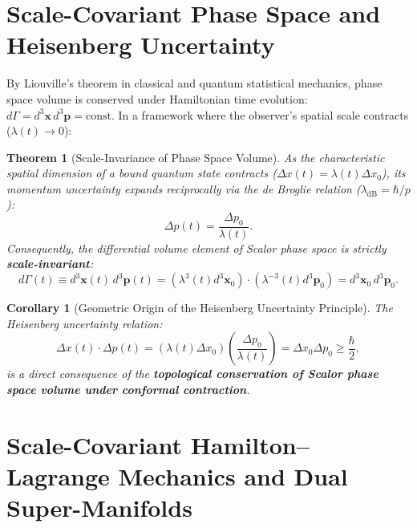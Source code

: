 \documentclass[11pt,a4paper]{article}
\newtheorem{theorem}{Theorem}[section]
\newtheorem{corollary}{Corollary}[theorem]
\begin{document}
\section{Scale-Covariant Phase Space and Heisenberg Uncertainty}
\label{sec:faz_uzayi_heisenberg}

By Liouville's theorem in classical and quantum statistical mechanics, phase space volume is conserved under Hamiltonian time evolution: $d\Gamma = d^3\mathbf{x} \, d^3\mathbf{p} = \text{const}$. In a framework where the observer's spatial scale contracts ($\lambda(t) \to 0$):

\begin{theorem}[Scale-Invariance of Phase Space Volume]
    \label{thm:faz_uzayi_degismezligi_sc}
    As the characteristic spatial dimension of a bound quantum state contracts ($\Delta x(t) = \lambda(t) \Delta x_0$), its momentum uncertainty expands reciprocally via the de Broglie relation ($\lambda_{\mathrm{dB}} = \hbar / p$):
    \begin{equation}
        \Delta p(t) = \frac{\Delta p_0}{\lambda(t)}.
        \label{eq:momentum_genlesme}
    \end{equation}
    Consequently, the differential volume element of Scalor phase space is strictly \textbf{scale-invariant}:
    \begin{equation}
        d\Gamma(t) \equiv d^3\mathbf{x}(t) \, d^3\mathbf{p}(t) = \left( \lambda^3(t) d^3\mathbf{x}_0 \right) \cdot \left( \lambda^{-3}(t) d^3\mathbf{p}_0 \right) = d^3\mathbf{x}_0 \, d^3\mathbf{p}_0.
        \label{eq:faz_hacmi_korunumu}
    \end{equation}
\end{theorem}

\begin{corollary}[Geometric Origin of the Heisenberg Uncertainty Principle]
    \label{cor:heisenberg_kokeni_sc}
    The Heisenberg uncertainty relation:
    \begin{equation}
        \Delta x(t) \cdot \Delta p(t) = \left( \lambda(t) \Delta x_0 \right) \left( \frac{\Delta p_0}{\lambda(t)} \right) = \Delta x_0 \Delta p_0 \ge \frac{\hbar}{2},
        \label{eq:heisenberg_turetilis}
    \end{equation}
    is a direct consequence of the \textbf{topological conservation of Scalor phase space volume under conformal contraction}.
\end{corollary}

\section{Scale-Covariant Hamilton--Lagrange Mechanics and Dual Super-Manifolds}
\label{sec:lagrange_mekanigi}
\end{document}
